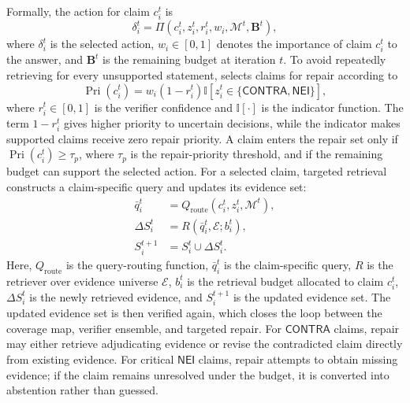 Formally, the action for claim $c_i^{t}$ is
\begin{equation}
    \delta_i^{t}
    =
    \Pi(c_i^{t},z_i^{t},r_i^{t},w_i,\mathcal{M}^{t},\mathbf{B}^{t}),
    \label{eq:framework_policy}
\end{equation}
where $\delta_i^{t}$ is the selected action, $w_i\in[0,1]$ denotes the importance of claim $c_i^{t}$ to the answer, and $\mathbf{B}^{t}$ is the remaining budget at iteration $t$.
To avoid repeatedly retrieving for every unsupported statement, \ragname selects claims for repair according to
\begin{equation}
    \operatorname{Pri}(c_i^{t})
    =
    w_i(1-r_i^{t})
    \mathbb{I}
    [z_i^{t}\in\{\mathsf{CONTRA},\mathsf{NEI}\}],
    \label{eq:framework_priority}
\end{equation}
where $r_i^{t}\in[0,1]$ is the verifier confidence and $\mathbb{I}[\cdot]$ is the indicator function. The term $1-r_i^{t}$ gives higher priority to uncertain decisions, while the indicator makes supported claims receive zero repair priority. A claim enters the repair set only if $\operatorname{Pri}(c_i^{t})\geq\tau_p$, where $\tau_p$ is the repair-priority threshold, and if the remaining budget can support the selected action. For a selected claim, targeted retrieval constructs a claim-specific query and updates its evidence set:
\begin{align}
    \bar{q}_i^{t}
    &=
    Q_{\mathrm{route}}(c_i^{t},z_i^{t},\mathcal{M}^{t}), \\
    \Delta S_i^{t}
    &=
    R(\bar{q}_i^{t},\mathcal{E};b_i^{t}), \\
    S_i^{t+1}
    &=
    S_i^{t}\cup \Delta S_i^{t}.
    \label{eq:framework_repair}
\end{align}
Here, $Q_{\mathrm{route}}$ is the query-routing function, $\bar{q}_i^{t}$ is the claim-specific query, $R$ is the retriever over evidence universe $\mathcal{E}$, $b_i^{t}$ is the retrieval budget allocated to claim $c_i^{t}$, $\Delta S_i^{t}$ is the newly retrieved evidence, and $S_i^{t+1}$ is the updated evidence set. The updated evidence set is then verified again, which closes the loop between the coverage map, verifier ensemble, and targeted repair. For $\mathsf{CONTRA}$ claims, repair may either retrieve adjudicating evidence or revise the contradicted claim directly from existing evidence. For critical $\mathsf{NEI}$ claims, repair attempts to obtain missing evidence; if the claim remains unresolved under the budget, it is converted into abstention rather than guessed.
